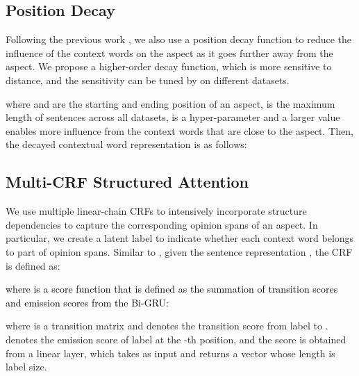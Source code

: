 \documentclass[11pt,a4paper]{article}
\begin{document}
\subsection{Position Decay}
Following the previous work \cite{lixin2018P18-1087, zhang-etal-2019-aspect, Tang:ACL2019}, we also use a position decay function to reduce the influence of the context words on the aspect as it goes further away from the aspect. 
We propose a higher-order decay function, which is more sensitive to distance, and the sensitivity can be tuned by  on different datasets. 
\setlength{\abovedisplayskip}{2pt} \setlength{\abovedisplayshortskip}{2pt}
\setlength{\belowdisplayskip}{8pt} \setlength{\belowdisplayshortskip}{8pt}

where  and  are the starting and ending position of an aspect,  is the maximum length of sentences across all datasets,  is a hyper-parameter and a larger value enables more influence from the context words that are close to the aspect.
Then, the decayed contextual word representation is as follows:



\subsection{Multi-CRF Structured Attention}








We use multiple linear-chain CRFs to intensively incorporate structure dependencies to capture the corresponding opinion spans of an aspect. In particular, we create a latent label \cite{bailin-lu:2018:AAAI2018}  to indicate whether each context word belongs to part of opinion spans.  Similar to \cite{lample-etal-2016-neural}, given the sentence representation , the CRF is defined as:
\setlength{\abovedisplayskip}{6pt} \setlength{\abovedisplayshortskip}{6pt}
\setlength{\belowdisplayskip}{6pt} \setlength{\belowdisplayshortskip}{6pt}

\textcolor{black}{where  is a score function that is defined as the summation of transition scores and emission scores from the Bi-GRU:}

where  is a transition matrix and  denotes the transition score from label  to .
 denotes the emission score of label  at the -th position, and the score is obtained from a linear layer, which takes   as input and returns a vector whose length is label size.
\end{document}
